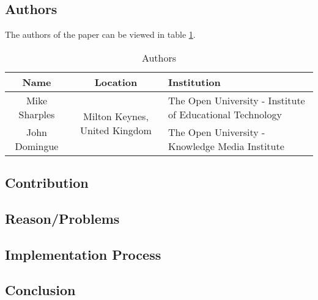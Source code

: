 \clearpage
\section*{\citet{2016_Sharples}}

\subsection*{Authors}
The authors of the paper can be viewed in table \ref{tab:2016_Sharples_Authors}.
\begin{longtable}{ |c|c|p{5cm}| }
	\caption{Authors} \label{tab:2016_Sharples_Authors} \\
	\hline
 	\cellcolor{Gray}Name & \cellcolor{Gray}Location & \cellcolor{Gray}Institution \\ [0.5ex] 
 	\hline\hline
 	\endhead
 	Mike Sharples & \multirow{3}{*}{\parbox{5cm}{\centering Milton Keynes, United Kingdom}}  & The Open University - Institute of Educational Technology  \\
	\cline{1-1}
	\cline{3-3}
	 John Domingue &   & The Open University - Knowledge Media Institute \\
	 \hline
\end{longtable}


\subsection*{Contribution}



\subsection*{Reason/Problems}



\subsection*{Implementation Process}


\subsection*{Conclusion}

